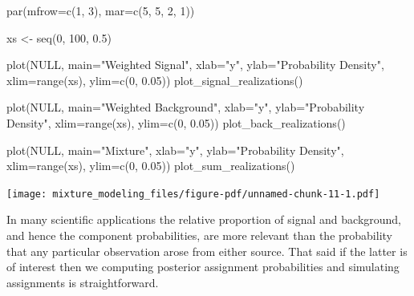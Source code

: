 \documentclass[
  letterpaper,
  DIV=11,
  numbers=noendperiod]{scrartcl}
\newenvironment{Shaded}{\begin{snugshade}}{\end{snugshade}}
\newcommand{\AttributeTok}[1]{\textcolor[rgb]{0.40,0.45,0.13}{#1}}
\newcommand{\ConstantTok}[1]{\textcolor[rgb]{0.56,0.35,0.01}{#1}}
\newcommand{\DecValTok}[1]{\textcolor[rgb]{0.68,0.00,0.00}{#1}}
\newcommand{\FloatTok}[1]{\textcolor[rgb]{0.68,0.00,0.00}{#1}}
\newcommand{\FunctionTok}[1]{\textcolor[rgb]{0.28,0.35,0.67}{#1}}
\newcommand{\NormalTok}[1]{\textcolor[rgb]{0.00,0.23,0.31}{#1}}
\newcommand{\OtherTok}[1]{\textcolor[rgb]{0.00,0.23,0.31}{#1}}
\newcommand{\StringTok}[1]{\textcolor[rgb]{0.13,0.47,0.30}{#1}}
\begin{document}
\begin{Shaded}
\begin{Highlighting}[]
\FunctionTok{par}\NormalTok{(}\AttributeTok{mfrow=}\FunctionTok{c}\NormalTok{(}\DecValTok{1}\NormalTok{, }\DecValTok{3}\NormalTok{), }\AttributeTok{mar=}\FunctionTok{c}\NormalTok{(}\DecValTok{5}\NormalTok{, }\DecValTok{5}\NormalTok{, }\DecValTok{2}\NormalTok{, }\DecValTok{1}\NormalTok{))}

\NormalTok{xs }\OtherTok{\textless{}{-}} \FunctionTok{seq}\NormalTok{(}\DecValTok{0}\NormalTok{, }\DecValTok{100}\NormalTok{, }\FloatTok{0.5}\NormalTok{)}

\FunctionTok{plot}\NormalTok{(}\ConstantTok{NULL}\NormalTok{, }\AttributeTok{main=}\StringTok{"Weighted Signal"}\NormalTok{,}
     \AttributeTok{xlab=}\StringTok{"y"}\NormalTok{, }\AttributeTok{ylab=}\StringTok{"Probability Density"}\NormalTok{,}
     \AttributeTok{xlim=}\FunctionTok{range}\NormalTok{(xs), }\AttributeTok{ylim=}\FunctionTok{c}\NormalTok{(}\DecValTok{0}\NormalTok{, }\FloatTok{0.05}\NormalTok{))}
\FunctionTok{plot\_signal\_realizations}\NormalTok{()}

\FunctionTok{plot}\NormalTok{(}\ConstantTok{NULL}\NormalTok{, }\AttributeTok{main=}\StringTok{"Weighted Background"}\NormalTok{,}
     \AttributeTok{xlab=}\StringTok{"y"}\NormalTok{, }\AttributeTok{ylab=}\StringTok{"Probability Density"}\NormalTok{,}
     \AttributeTok{xlim=}\FunctionTok{range}\NormalTok{(xs), }\AttributeTok{ylim=}\FunctionTok{c}\NormalTok{(}\DecValTok{0}\NormalTok{, }\FloatTok{0.05}\NormalTok{))}
\FunctionTok{plot\_back\_realizations}\NormalTok{()}

\FunctionTok{plot}\NormalTok{(}\ConstantTok{NULL}\NormalTok{, }\AttributeTok{main=}\StringTok{"Mixture"}\NormalTok{,}
     \AttributeTok{xlab=}\StringTok{"y"}\NormalTok{, }\AttributeTok{ylab=}\StringTok{"Probability Density"}\NormalTok{,}
     \AttributeTok{xlim=}\FunctionTok{range}\NormalTok{(xs), }\AttributeTok{ylim=}\FunctionTok{c}\NormalTok{(}\DecValTok{0}\NormalTok{, }\FloatTok{0.05}\NormalTok{))}
\FunctionTok{plot\_sum\_realizations}\NormalTok{()}
\end{Highlighting}
\end{Shaded}

\texttt{[image: mixture\_modeling\_files/figure-pdf/unnamed-chunk-11-1.pdf]}

In many scientific applications the relative proportion of signal and
background, and hence the component probabilities, are more relevant
than the probability that any particular observation arose from either
source. That said if the latter is of interest then we computing
posterior assignment probabilities and simulating assignments is
straightforward.
\end{document}
